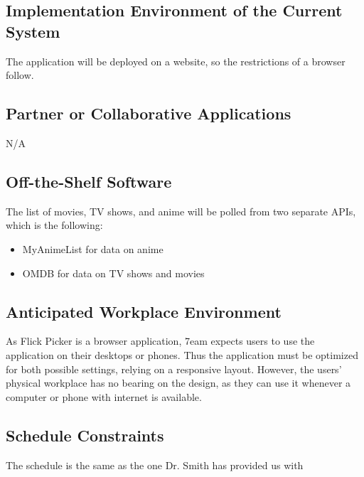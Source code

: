 \documentclass[12pt]{article}
\begin{document}
\subsection{Implementation Environment of the Current System}
The application will be deployed on a website, so the restrictions of a browser follow.

\subsection{Partner or Collaborative Applications}
N/A

\subsection{Off-the-Shelf Software}
The list of movies, TV shows, and anime will be polled from two separate APIs, which is the following:
\begin{itemize}
	\item MyAnimeList for data on anime
	\item OMDB for data on TV shows and movies
\end{itemize}

\subsection{Anticipated Workplace Environment}
As Flick Picker is a browser application, 7eam expects users to use the application on their desktops or phones. Thus the application must be optimized for both possible settings, relying on a responsive layout. However, the users' physical workplace has no bearing on the design, as they can use it whenever a computer or phone with internet is available. 

\subsection{Schedule Constraints}
The schedule is the same as the one Dr. Smith has provided us with
\end{document}
